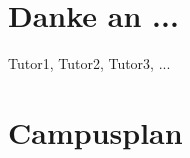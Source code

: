 \documentclass[12pt]{article}
\begin{document}
\tableofcontents

\section{Danke an ...}

Tutor1, Tutor2, Tutor3, ...

















\section{Campusplan}
\end{document}
